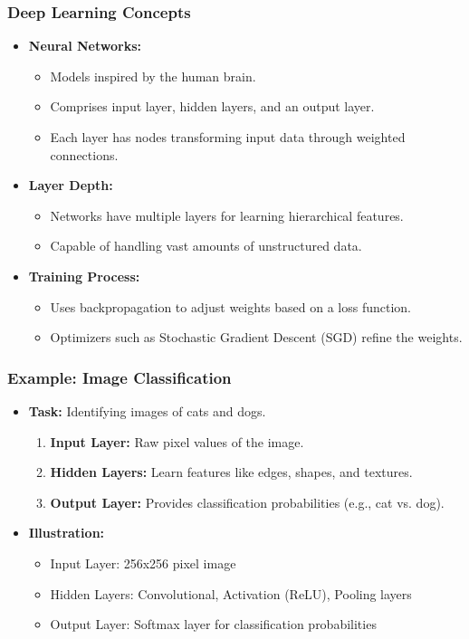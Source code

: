 \documentclass[aspectratio=169]{beamer}
\begin{document}
\begin{frame}[fragile]
    \frametitle{Deep Learning Concepts}
    \begin{itemize}
        \item \textbf{Neural Networks:}
        \begin{itemize}
            \item Models inspired by the human brain.
            \item Comprises input layer, hidden layers, and an output layer.
            \item Each layer has nodes transforming input data through weighted connections.
        \end{itemize}
        
        \item \textbf{Layer Depth:}
        \begin{itemize}
            \item Networks have multiple layers for learning hierarchical features.
            \item Capable of handling vast amounts of unstructured data.
        \end{itemize}
        
        \item \textbf{Training Process:}
        \begin{itemize}
            \item Uses backpropagation to adjust weights based on a loss function.
            \item Optimizers such as Stochastic Gradient Descent (SGD) refine the weights.
        \end{itemize}
    \end{itemize}
\end{frame}

\begin{frame}[fragile]
    \frametitle{Example: Image Classification}
    \begin{itemize}
        \item \textbf{Task:} Identifying images of cats and dogs.
        \begin{enumerate}
            \item \textbf{Input Layer:} Raw pixel values of the image.
            \item \textbf{Hidden Layers:} Learn features like edges, shapes, and textures.
            \item \textbf{Output Layer:} Provides classification probabilities (e.g., cat vs. dog).
        \end{enumerate}
        
        \item \textbf{Illustration:}
        \begin{itemize}
            \item Input Layer: 256x256 pixel image
            \item Hidden Layers: Convolutional, Activation (ReLU), Pooling layers
            \item Output Layer: Softmax layer for classification probabilities
        \end{itemize}
    \end{itemize}
\end{frame}
\end{document}
